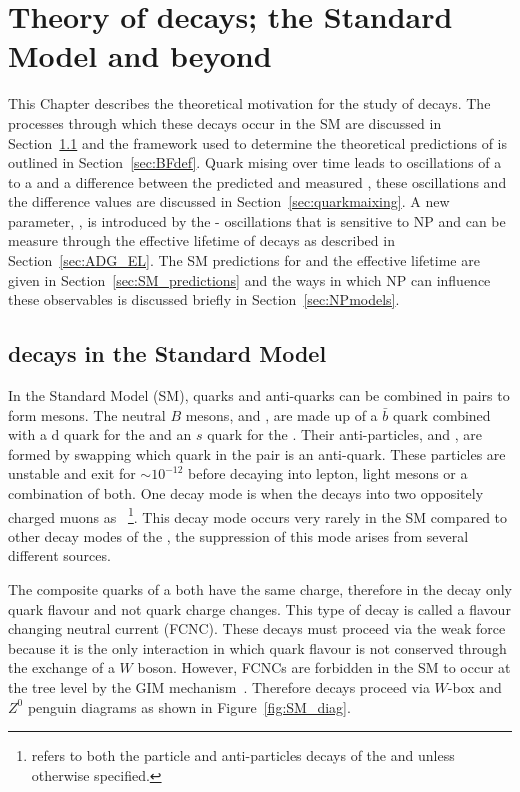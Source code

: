\chapter{Theory of  decays; the Standard Model and beyond}
\label{sec:theory_chptr}
This Chapter describes the theoretical motivation for the study of \bmumu decays. 
The processes through which these decays occur in the SM are discussed in Section~\ref{sec:bsmumu_in_SM} and the framework used to determine the theoretical predictions of \BFs is outlined in Section~\ref{sec:BFdef}. 
Quark mising over time leads to oscillations of a \bs to a \barbs and a difference between the predicted and measured \bsmumu \BF, these oscillations and the difference \BFs values are discussed in Section~\ref{sec:quarkmaixing}. 
A new parameter, \ADG, is introduced by the \bs - \barbs oscillations that is sensitive to NP and can be measure through the effective lifetime of \bsmumu decays as described in Section~\ref{sec:ADG_EL}. The SM predictions for \BFs and the effective lifetime are given in Section~\ref{sec:SM_predictions} and the ways in which NP can influence these observables is discussed briefly in Section~\ref{sec:NPmodels}.



\section{ decays in the Standard Model}
\label{sec:bsmumu_in_SM}
In the Standard Model (SM), quarks and anti-quarks can be combined in pairs to form mesons. The neutral $B$ mesons, \bd and \bs, are made up of a $\bar{b}$ quark combined with a d quark for the \bd and an $s$ quark for the \bs. Their anti-particles, \barbd and \barbs, are formed by swapping which quark in the pair is an anti-quark. These particles are unstable and exit for $\sim 10^{-12}$ before decaying into lepton, light mesons or a combination of both. One decay mode is when the \bsd decays into two oppositely charged muons as \bmumu~\footnote{\bmumu refers to both the particle and anti-particles decays of the \bd and \bs unless otherwise specified.}. This decay mode occurs very rarely in the SM compared to other decay modes of the \bsd, the suppression of this mode arises from several different sources.

The composite quarks of a \bsd both have the same charge, therefore in the decay \bmumu only quark flavour and not quark charge changes. This type of decay is called a flavour changing neutral current (FCNC). These decays must proceed via the weak force because it is the only interaction in which quark flavour is not conserved through the exchange of a $W$ boson. However, FCNCs are forbidden in the SM to occur at the tree level by the GIM mechanism~\cite{}. Therefore \bmumu decays proceed via $W$-box and $Z^0$ penguin diagrams as shown in Figure~\ref{fig:SM_diag}.

